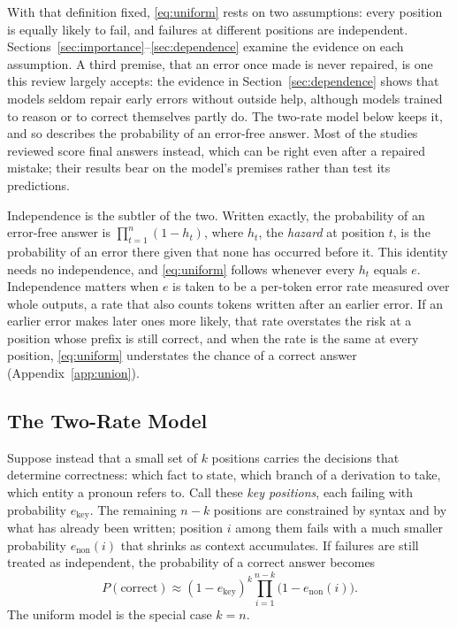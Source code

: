 \documentclass{ieeeaccess}
\begin{document}
With that definition fixed, \eqref{eq:uniform} rests on two assumptions: every position is equally likely to fail, and failures at different positions are independent. Sections~\ref{sec:importance}--\ref{sec:dependence} examine the evidence on each assumption. A third premise, that an error once made is never repaired, is one this review largely accepts: the evidence in Section~\ref{sec:dependence} shows that models seldom repair early errors without outside help, although models trained to reason or to correct themselves partly do. The two-rate model below keeps it, and so describes the probability of an error-free answer. Most of the studies reviewed score final answers instead, which can be right even after a repaired mistake; their results bear on the model's premises rather than test its predictions.

Independence is the subtler of the two. Written exactly, the probability of an error-free answer is $\prod_{t=1}^{n}(1-h_t)$, where $h_t$, the \emph{hazard} at position $t$, is the probability of an error there given that none has occurred before it. This identity needs no independence, and \eqref{eq:uniform} follows whenever every $h_t$ equals $e$. Independence matters when $e$ is taken to be a per-token error rate measured over whole outputs, a rate that also counts tokens written after an earlier error. If an earlier error makes later ones more likely, that rate overstates the risk at a position whose prefix is still correct, and when the rate is the same at every position, \eqref{eq:uniform} understates the chance of a correct answer (Appendix~\ref{app:union}).

\subsection{The Two-Rate Model}
Suppose instead that a small set of $k$ positions carries the decisions that determine correctness: which fact to state, which branch of a derivation to take, which entity a pronoun refers to. Call these \emph{key positions}, each failing with probability $e_{\text{key}}$. The remaining $n-k$ positions are constrained by syntax and by what has already been written; position $i$ among them fails with a much smaller probability $e_{\text{non}}(i)$ that shrinks as context accumulates. If failures are still treated as independent, the probability of a correct answer becomes
\begin{equation}
\label{eq:tworate}
P(\text{correct}) \approx (1-e_{\text{key}})^{k} \prod_{i=1}^{n-k} \bigl(1-e_{\text{non}}(i)\bigr).
\end{equation}
The uniform model is the special case $k = n$.
\end{document}
